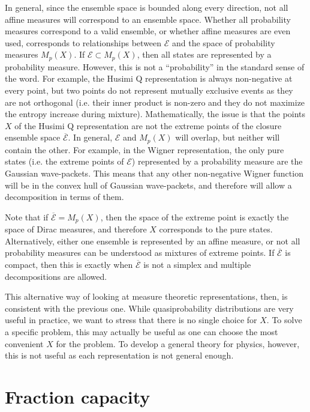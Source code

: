 \documentclass[10pt,twocolumn, nofootinbib]{revtex4-2}
\newcommand{\Ens}[1][E] {\mathcal{#1}} %
\begin{document}
In general, since the ensemble space is bounded along every direction, not all affine measures will correspond to an ensemble space. Whether all probability measures correspond to a valid ensemble, or whether affine measures are even used, corresponds to relationships between $\Ens$ and the space of probability measures $M_p(X)$. If $\Ens \subset M_p(X)$, then all states are represented by a probability measure. However, this is not a ``probability'' in the standard sense of the word. For example, the Husimi Q representation is always non-negative at every point, but two points do not represent mutually exclusive events as they are not orthogonal (i.e. their inner product is non-zero and they do not maximize the entropy increase during mixture). Mathematically, the issue is that the points $X$ of the Husimi Q representation are not the extreme points of the closure ensemble space $\overline{\Ens}$. In general, $\Ens$ and $M_p(X)$ will overlap, but neither will contain the other. For example, in the Wigner representation, the only pure states (i.e. the extreme points of $\Ens$) represented by a probability measure are the Gaussian wave-packets. This means that any other non-negative Wigner function will be in the convex hull of Gaussian wave-packets, and therefore will allow a decomposition in terms of them.

Note that if $\overline{\Ens} = M_p(X)$, then the space of the extreme point is exactly the space of Dirac measures, and therefore $X$ corresponds to the pure states. Alternatively, either one ensemble is represented by an affine measure, or not all probability measures can be understood as mixtures of extreme points. If $\overline{\Ens}$ is compact, then this is exactly when $\overline{\Ens}$ is not a simplex and multiple decompositions are allowed.



This alternative way of looking at measure theoretic representations, then, is consistent with the previous one. While quasiprobability distributions are very useful in practice, we want to stress that there is no single choice for $X$. To solve a specific problem, this may actually be useful as one can choose the most convenient $X$ for the problem. To develop a general theory for physics, however, this is not useful as each representation is not general enough.


\section{Fraction capacity}
\end{document}
